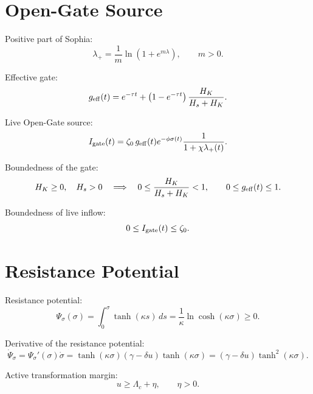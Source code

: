 \documentclass[11pt,a4paper]{article}
\newcommand{\Igate}{I_{\rm gate}}
\theoremstyle{remark}
\begin{document}
\section{Open-Gate Source}

Positive part of Sophia:
\begin{equation}
  \lambda_+=\frac{1}{m}\ln(1+e^{m\lambda}),
  \qquad m>0.
\end{equation}

Effective gate:
\begin{equation}
  g_{\rm eff}(t)=e^{-\tau t}+\left(1-e^{-\tau t}\right)\frac{H_K}{H_s+H_K}.
\end{equation}

Live Open-Gate source:
\begin{equation}
  \Igate(t)=\zeta_0\,g_{\rm eff}(t)e^{-\phi\sigma(t)}
  \frac{1}{1+\chi\lambda_+(t)}.
\end{equation}

Boundedness of the gate:
\begin{equation}
  H_K\ge0,\quad H_s>0
  \quad\Longrightarrow\quad
  0\le \frac{H_K}{H_s+H_K}<1,
  \qquad
  0\le g_{\rm eff}(t)\le1.
\end{equation}

Boundedness of live inflow:
\begin{equation}
  0\le \Igate(t)\le \zeta_0.
\end{equation}

\section{Resistance Potential}

Resistance potential:
\begin{equation}
  \Psi_\sigma(\sigma)=\int_0^\sigma\tanh(\kappa s)\,ds
  =\frac{1}{\kappa}\ln\cosh(\kappa\sigma)\ge0.
\end{equation}

Derivative of the resistance potential:
\begin{equation}
  \dot\Psi_\sigma
  =\Psi_\sigma'(\sigma)\dot\sigma
  =\tanh(\kappa\sigma)(\gamma-\delta u)\tanh(\kappa\sigma)
  =(\gamma-\delta u)\tanh^2(\kappa\sigma).
\end{equation}

Active transformation margin:
\begin{equation}
  u\ge\Lambda_c+\eta,
  \qquad \eta>0.
\end{equation}
\end{document}

